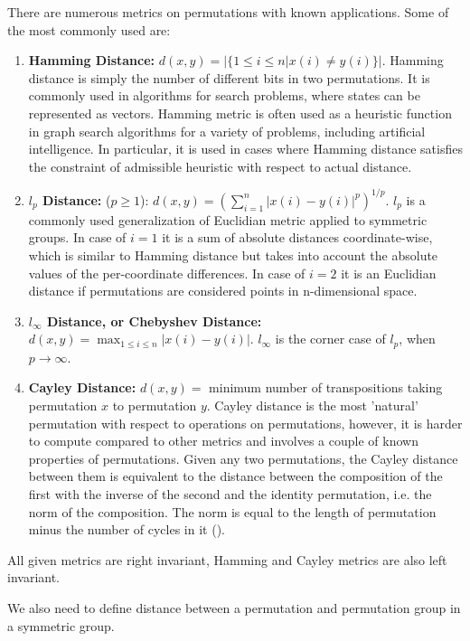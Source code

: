 \documentclass[12pt]{report}
\begin{document}
There are numerous metrics on permutations with known applications. Some of the most commonly used are:

\begin{enumerate}
	\item \textbf{Hamming Distance:} $d(x, y) = |\{ 1 \leq i \leq n | x(i) \neq y(i) \}|$.
	Hamming distance is simply the number of different bits in two permutations. It is commonly used in algorithms for search problems, where states can be represented as vectors.
	Hamming metric is often used as a heuristic function in graph search algorithms for a variety of problems, including artificial intelligence. In particular, it is used in cases where Hamming distance satisfies the constraint of admissible heuristic with respect to actual distance.
	
	\item \textbf{$l_p$ Distance:} ($p \geq 1$): $d(x, y) = (\sum\limits_{i=1}^{n} |x(i) - y(i)|^p)^{1/p}$.
	$l_p$ is a commonly used generalization of Euclidian metric applied to symmetric groups. In case of $i = 1$ it is a sum of absolute distances coordinate-wise, which is similar to Hamming distance but takes into account the absolute values of the per-coordinate differences.
	In case of $i = 2$ it is an Euclidian distance if permutations are considered points in n-dimensional space.
	
	\item \textbf{ $l_{\infty}$ Distance, or Chebyshev Distance:} $d(x, y) = \max_{1 \leq i \leq n} |x(i) - y(i)|$.
	$l_{\infty}$ is the corner case of $l_p$, when $p \rightarrow \infty$.
	
	\item \textbf{Cayley Distance:} $d(x, y) = $ minimum number of transpositions taking permutation $x$ to permutation $y$.
	Cayley distance is the most 'natural' permutation with respect to operations on permutations, however, it is harder to compute compared to other metrics and involves a couple of known properties of permutations.
	Given any two permutations, the Cayley distance between them is equivalent to the distance between the composition of the first with the inverse of the second and the identity permutation, i.e. the norm of the composition. The norm is equal to the length of permutation minus the number of cycles in it (\cite{Cayley}).
\end{enumerate}

All given metrics are right invariant, Hamming and Cayley metrics are also left invariant.

We also need to define distance between a permutation and permutation group in a symmetric group.
\end{document}
